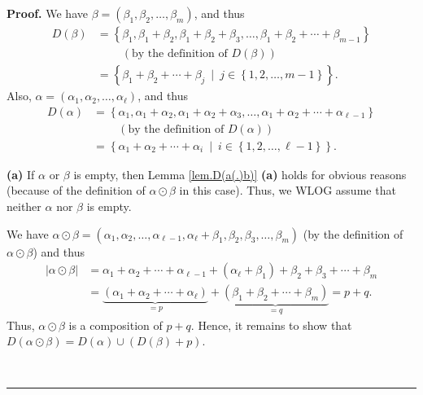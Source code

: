 \documentclass
[numbers=enddot,12pt,final,onecolumn,notitlepage,abstracton]{scrartcl}%
\theoremstyle{definition}
\newenvironment{proof}[1][Proof]{\noindent\textbf{#1.} }{\ \rule{0.5em}{0.5em}}
\newenvironment{verlong}{}{}
\begin{document}
\begin{verlong}
\begin{proof}
We have $\beta=\left(  \beta_{1},\beta_{2},\ldots,\beta_{m}\right)  $, and
thus%
\begin{align*}
D\left(  \beta\right)   &  =\left\{  \beta_{1},\beta_{1}+\beta_{2},\beta
_{1}+\beta_{2}+\beta_{3},\ldots,\beta_{1}+\beta_{2}+\cdots+\beta_{m-1}\right\}
\\
&  \ \ \ \ \ \ \ \ \ \ \left(  \text{by the definition of }D\left(
\beta\right)  \right) \\
&  =\left\{  \beta_{1}+\beta_{2}+\cdots+\beta_{j}\ \mid\ j\in\left\{
1,2,\ldots,m-1\right\}  \right\}  .
\end{align*}
Also, $\alpha=\left(  \alpha_{1},\alpha_{2},\ldots,\alpha_{\ell}\right)  $,
and thus%
\begin{align*}
D\left(  \alpha\right)   &  =\left\{  \alpha_{1},\alpha_{1}+\alpha_{2}%
,\alpha_{1}+\alpha_{2}+\alpha_{3},\ldots,\alpha_{1}+\alpha_{2}+\cdots
+\alpha_{\ell-1}\right\} \\
&  \ \ \ \ \ \ \ \ \ \ \left(  \text{by the definition of }D\left(
\alpha\right)  \right) \\
&  =\left\{  \alpha_{1}+\alpha_{2}+\cdots+\alpha_{i}\ \mid\ i\in\left\{
1,2,\ldots,\ell-1\right\}  \right\}  .
\end{align*}


\textbf{(a)} If $\alpha$ or $\beta$ is empty, then Lemma \ref{lem.D(a(.)b)}
\textbf{(a)} holds for obvious reasons (because of the definition of
$\alpha\odot\beta$ in this case). Thus, we WLOG assume that neither $\alpha$
nor $\beta$ is empty.

We have $\alpha\odot\beta=\left(  \alpha_{1},\alpha_{2},\ldots,\alpha_{\ell
-1},\alpha_{\ell}+\beta_{1},\beta_{2},\beta_{3},\ldots,\beta_{m}\right)  $ (by
the definition of $\alpha\odot\beta$) and thus%
\begin{align*}
\left\vert \alpha\odot\beta\right\vert  &  =\alpha_{1}+\alpha_{2}%
+\cdots+\alpha_{\ell-1}+\left(  \alpha_{\ell}+\beta_{1}\right)  +\beta
_{2}+\beta_{3}+\cdots+\beta_{m}\\
&  =\underbrace{\left(  \alpha_{1}+\alpha_{2}+\cdots+\alpha_{\ell}\right)
}_{=p}+\underbrace{\left(  \beta_{1}+\beta_{2}+\cdots+\beta_{m}\right)  }%
_{=q}=p+q.
\end{align*}
Thus, $\alpha\odot\beta$ is a composition of $p+q$. Hence, it remains to show
that $D\left(  \alpha\odot\beta\right)  =D\left(  \alpha\right)  \cup\left(
D\left(  \beta\right)  +p\right)  $.


\end{proof}
\end{verlong}
\end{document}
